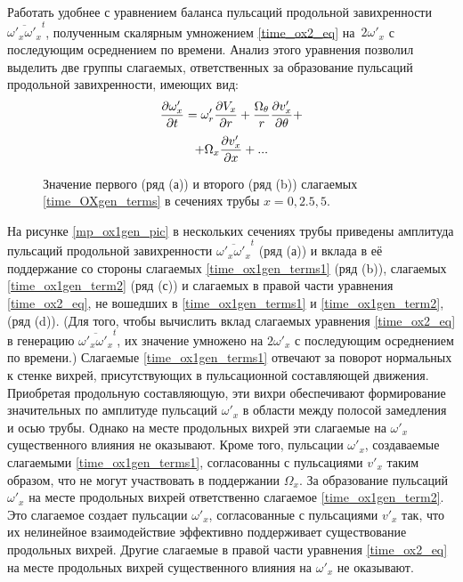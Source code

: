 Работать удобнее с уравнением баланса пульсаций продольной завихренности $\overline{\omega'_x \omega'_x}^t$, полученным скалярным умножением \eqref{time_ox2_eq} на~$2 \omega'_x$ с последующим осреднением по времени. Анализ этого уравнения позволил выделить две группы слагаемых, ответственных за образование пульсаций продольной завихренности, имеющих вид:
\begin{equation}\label{time_ox1gen_terms1}
\frac{\partial \omega'_x}{\partial t} = \omega'_r \frac {\partial V_x}{\partial r} + \frac{\Omega_\theta}{r} \frac{\partial v'_x}{\partial \theta} + 
\end{equation}
\begin{equation}\label{time_ox1gen_term2}
+\Omega_x \frac {\partial v'_x}{\partial x} + ...
\end{equation}


\begin{figure}[h]
\caption{Значение первого (ряд (а)) и второго (ряд (b)) слагаемых \eqref{time_OXgen_terms} в сечениях трубы $x=0,2.5,5$. }
\label{OXgen_terms_cmp_pic}
\end{figure}


На рисунке \ref{mp_ox1gen_pic} в нескольких сечениях трубы приведены амплитуда пульсаций продольной завихренности $\overline{\omega'_x \omega'_x}^t$ (ряд (а)) и вклада в её поддержание со стороны слагаемых \eqref{time_ox1gen_terms1} (ряд (b)), слагаемых \eqref{time_ox1gen_term2} (ряд (с)) и слагаемых в правой части уравнения \eqref{time_ox2_eq}, не вошедших в \eqref{time_ox1gen_terms1} и \eqref{time_ox1gen_term2}, (ряд (d)). (Для того, чтобы вычислить вклад слагаемых уравнения \eqref{time_ox2_eq} в генерацию $\overline{\omega'_x \omega'_x}^t$, их значение умножено на $2\omega'_x$ с последующим осреднением по времени.) Слагаемые \eqref{time_ox1gen_terms1} отвечают за поворот нормальных к стенке вихрей, присутствующих в пульсационной составляющей движения. Приобретая продольную составляющую, эти вихри обеспечивают формирование значительных по амплитуде пульсаций $\omega'_x$ в области между полосой замедления и осью трубы. Однако на месте продольных вихрей эти слагаемые на $\omega'_x$ существенного влияния не оказывают. Кроме того, пульсации $\omega'_x$, создаваемые слагаемыми \eqref{time_ox1gen_terms1}, согласованны с пульсациями $v'_x$ таким образом, что не могут участвовать в поддержании $\Omega_x$. За образование пульсаций $\omega'_x$ на месте продольных вихрей ответственно слагаемое \eqref{time_ox1gen_term2}. Это слагаемое создает пульсации $\omega'_x$, согласованные с пульсациями $v'_x$ так, что их нелинейное взаимодействие эффективно поддерживает существование продольных вихрей. Другие слагаемые в правой части уравнения \eqref{time_ox2_eq} на месте продольных вихрей существенного влияния на $\omega'_x$ не оказывают. 


